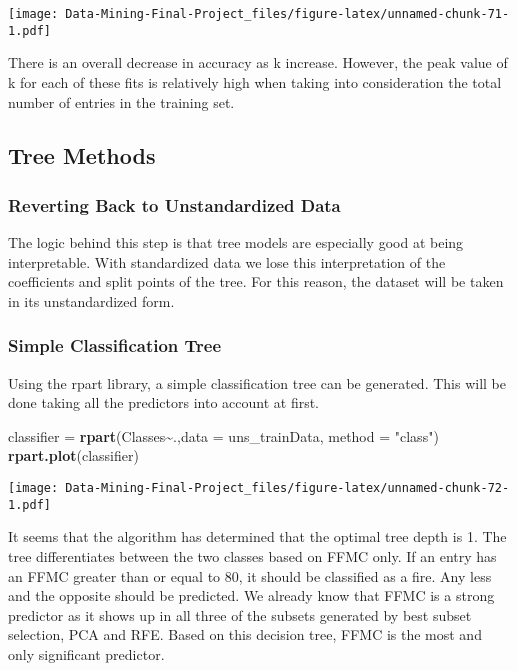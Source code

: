 \documentclass[
]{article}
\newenvironment{Shaded}{\begin{snugshade}}{\end{snugshade}}
\newcommand{\AttributeTok}[1]{\textcolor[rgb]{0.13,0.29,0.53}{#1}}
\newcommand{\FunctionTok}[1]{\textcolor[rgb]{0.13,0.29,0.53}{\textbf{#1}}}
\newcommand{\NormalTok}[1]{#1}
\newcommand{\OtherTok}[1]{\textcolor[rgb]{0.56,0.35,0.01}{#1}}
\newcommand{\SpecialCharTok}[1]{\textcolor[rgb]{0.81,0.36,0.00}{\textbf{#1}}}
\newcommand{\StringTok}[1]{\textcolor[rgb]{0.31,0.60,0.02}{#1}}
\begin{document}
\texttt{[image: Data-Mining-Final-Project\_files/figure-latex/unnamed-chunk-71-1.pdf]}

There is an overall decrease in accuracy as k increase. However, the
peak value of k for each of these fits is relatively high when taking
into consideration the total number of entries in the training set.

\subsection{Tree Methods}\label{tree-methods}

\subsubsection{Reverting Back to Unstandardized
Data}\label{reverting-back-to-unstandardized-data}

The logic behind this step is that tree models are especially good at
being interpretable. With standardized data we lose this interpretation
of the coefficients and split points of the tree. For this reason, the
dataset will be taken in its unstandardized form.

\subsubsection{Simple Classification
Tree}\label{simple-classification-tree}

Using the rpart library, a simple classification tree can be generated.
This will be done taking all the predictors into account at first.

\begin{Shaded}
\begin{Highlighting}[]
\NormalTok{classifier }\OtherTok{=} \FunctionTok{rpart}\NormalTok{(Classes}\SpecialCharTok{\textasciitilde{}}\NormalTok{.,}\AttributeTok{data =}\NormalTok{ uns\_trainData, }\AttributeTok{method =} \StringTok{"class"}\NormalTok{)}
\FunctionTok{rpart.plot}\NormalTok{(classifier)}
\end{Highlighting}
\end{Shaded}

\texttt{[image: Data-Mining-Final-Project\_files/figure-latex/unnamed-chunk-72-1.pdf]}

It seems that the algorithm has determined that the optimal tree depth
is 1. The tree differentiates between the two classes based on FFMC
only. If an entry has an FFMC greater than or equal to 80, it should be
classified as a fire. Any less and the opposite should be predicted. We
already know that FFMC is a strong predictor as it shows up in all three
of the subsets generated by best subset selection, PCA and RFE. Based on
this decision tree, FFMC is the most and only significant predictor.
\end{document}
